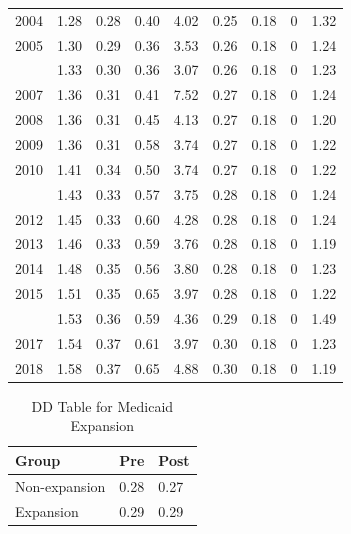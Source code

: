 \documentclass[
  12pt,
]{article}
\begin{document}
\begin{table}[H]
\begin{tabular}[t]{lrrrrrrrr}
2004 & 1.28 & 0.28 & 0.40 & 4.02 & 0.25 & 0.18 & 0 & 1.32\\
2005 & 1.30 & 0.29 & 0.36 & 3.53 & 0.26 & 0.18 & 0 & 1.24\\
\addlinespace
2006 & 1.33 & 0.30 & 0.36 & 3.07 & 0.26 & 0.18 & 0 & 1.23\\
2007 & 1.36 & 0.31 & 0.41 & 7.52 & 0.27 & 0.18 & 0 & 1.24\\
2008 & 1.36 & 0.31 & 0.45 & 4.13 & 0.27 & 0.18 & 0 & 1.20\\
2009 & 1.36 & 0.31 & 0.58 & 3.74 & 0.27 & 0.18 & 0 & 1.22\\
2010 & 1.41 & 0.34 & 0.50 & 3.74 & 0.27 & 0.18 & 0 & 1.22\\
\addlinespace
2011 & 1.43 & 0.33 & 0.57 & 3.75 & 0.28 & 0.18 & 0 & 1.24\\
2012 & 1.45 & 0.33 & 0.60 & 4.28 & 0.28 & 0.18 & 0 & 1.24\\
2013 & 1.46 & 0.33 & 0.59 & 3.76 & 0.28 & 0.18 & 0 & 1.19\\
2014 & 1.48 & 0.35 & 0.56 & 3.80 & 0.28 & 0.18 & 0 & 1.23\\
2015 & 1.51 & 0.35 & 0.65 & 3.97 & 0.28 & 0.18 & 0 & 1.22\\
\addlinespace
2016 & 1.53 & 0.36 & 0.59 & 4.36 & 0.29 & 0.18 & 0 & 1.49\\
2017 & 1.54 & 0.37 & 0.61 & 3.97 & 0.30 & 0.18 & 0 & 1.23\\
2018 & 1.58 & 0.37 & 0.65 & 4.88 & 0.30 & 0.18 & 0 & 1.19\\
\bottomrule
\end{tabular}
\end{table}

\newpage

\begin{table}[H]

\caption{\label{tab:dd-table}DD Table for Medicaid Expansion}
\centering
\begin{tabular}[t]{lll}
\toprule
Group & Pre & Post\\
\midrule
Non-expansion & 0.28 & 0.27\\
Expansion & 0.29 & 0.29\\
\bottomrule
\end{tabular}
\end{table}

\newpage
\end{document}

